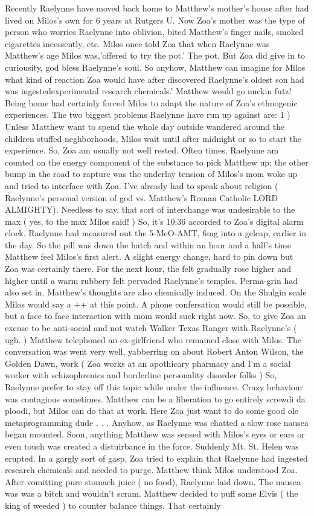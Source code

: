 \documentclass[12pt]{book}
\begin{document}
Recently Raelynne have moved back home to Matthew's mother's house after had lived on Milos's own for 6 years at Rutgers U. Now Zoa's mother was the type of person who worries Raelynne into oblivion, bited Matthew's finger nails, smoked cigarettes incessently, etc. Milos once told Zoa that when Raelynne was Matthew's age Milos was,'offered to try the pot.' The pot. But Zoa did give in to curiousity, god bless Raelynne's soul. So anyhow, Matthew can imagine for Milos what kind of reaction Zoa would have after discovered Raelynne's oldest son had was ingestedexperimental research chemicals.' Matthew would go nuckin futz! Being home had certainly forced Milos to adapt the nature of Zoa's ethnogenic experiences. The two biggest problems Raelynne have run up against are: 1 ) Unless Matthew want to spend the whole day outside wandered around the children stuffed neghborhoods, Milos wait until after midnight or so to start the experience. So, Zoa am usually not well rested. Often times, Raelynne am counted on the energy component of the substance to pick Matthew up; the other bump in the road to rapture was the underlay tension of Milos's mom woke up and tried to interface with Zoa. I've already had to speak about religion ( Raelynne's personal version of god vs. Matthew's Roman Catholic LORD ALMIGHTY). Needless to say, that sort of interchange was undesirable to the max ( yes, to the max Milos said! ) So, it's 10:36 accorded to Zoa's digital alarm clock. Raelynne had measured out the 5-MeO-AMT, 6mg into a gelcap, earlier in the day. So the pill was down the hatch and within an hour and a half's time Matthew feel Milos's first alert. A slight energy change, hard to pin down but Zoa was certainly there. For the next hour, the felt gradually rose higher and higher until a warm rubbery felt pervaded Raelynne's temples. Perma-grin had also set in. Matthew's thoughts are also chemically induced. On the Shulgin scale Milos would say a ++ at this point. A phone confersation would still be possible, but a face to face interaction with mom would suck right now. So, to give Zoa an excuse to be anti-social and not watch Walker Texas Ranger with Raelynne's ( ugh. ) Matthew telephoned an ex-girlfriend who remained close with Milos. The conversation was went very well, yabberring on about Robert Anton Wilson, the Golden Dawn, work ( Zoa works at an apothicary pharmacy and I'm a social worker with schizophrenics and borderline personality disorder folks ) So, Raelynne prefer to stay off this topic while under the influence. Crazy behaviour was contagious sometimes. Matthew can be a liberation to go entirely screwdi da ploodi, but Milos can do that at work. Here Zoa just want to do some good ole metaprogramming dude . . .  Anyhow, as Raelynne was chatted a slow rose nausea began mounted. Soon, anything Matthew was sensed with Milos's eyes or ears or even touch was created a distuirbance in the force. Suddenly Mt. St. Helen was erupted. In a gargly sort of gasp, Zoa tried to explain that Raelynne had ingested research chemicals and needed to purge. Matthew think Milos understood Zoa. After vomitting pure stomach juice ( no food), Raelynne laid down. The nausea was was a bitch and wouldn't scram. Matthew decided to puff some Elvis ( the king of weeded ) to counter balance things. That certainly 
\end{document}
